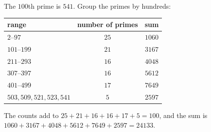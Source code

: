 The $100$th prime is $541$. Group the primes by hundreds:
\begin{center}
\begin{tabular}{lcc}
range & number of primes & sum\\ \hline
$2$--$97$ & $25$ & $1060$\\
$101$--$199$ & $21$ & $3167$\\
$211$--$293$ & $16$ & $4048$\\
$307$--$397$ & $16$ & $5612$\\
$401$--$499$ & $17$ & $7649$\\
$503,509,521,523,541$ & $5$ & $2597$
\end{tabular}
\end{center}
The counts add to $25+21+16+16+17+5=100$, and the sum is $1060+3167+4048+5612+7649+2597=\boxed{24133}$.
